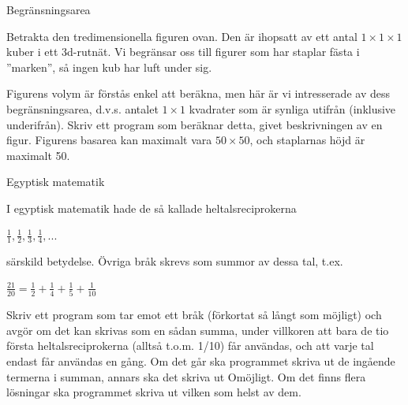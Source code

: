 \documentclass[10pt]{beamer}
\begin{document}
\begin{frame}{Begränsningsarea}
\begin{figure}[!ht]
\begin{subfigure}[b]{0.3\textwidth}
        \label{fig:begransningsarea_input}
    \end{subfigure}
\end{figure}



Betrakta den tredimensionella figuren ovan. Den är ihopsatt av ett antal $1\times1\times1$ kuber i ett 3d-rutnät. Vi begränsar oss till figurer som har staplar fästa i ''marken'', så ingen kub har luft under sig. 

Figurens volym är förstås enkel att beräkna, men här är vi intresserade av dess begränsningsarea, d.v.s. antalet $1\times1$ kvadrater som är synliga utifrån (inklusive underifrån). Skriv ett program som beräknar detta, givet beskrivningen av en figur.
Figurens basarea kan maximalt vara $50\times50$, och staplarnas höjd är maximalt 50. 

\end{frame}










\begin{frame}{Egyptisk matematik}

I egyptisk matematik hade de så kallade heltalsreciprokerna

${\displaystyle {\frac {1}{1}},{\frac {1}{2}},{\frac {1}{3}},{\frac {1}{4}},...}$

särskild betydelse. Övriga bråk skrevs som summor av dessa tal, t.ex.

${\displaystyle {\frac {21}{20}}={\frac {1}{2}}+{\frac {1}{4}}+{\frac {1}{5}}+{\frac {1}{10}}}$

Skriv ett program som tar emot ett bråk (förkortat så långt som möjligt) och avgör om det kan skrivas som en sådan summa, under villkoren att bara de tio första heltalsreciprokerna (alltså t.o.m. 1/10) får användas, och att varje tal endast får användas en gång. Om det går ska programmet skriva ut de ingående termerna i summan, annars ska det skriva ut Omöjligt. Om det finns flera lösningar ska programmet skriva ut vilken som helst av dem.

\end{frame}
\end{document}
